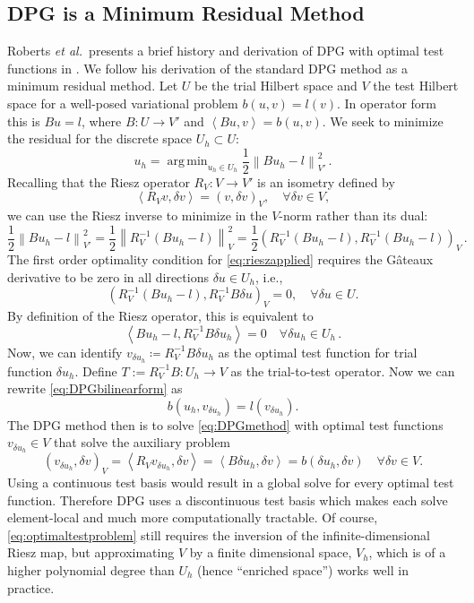 \documentclass[letterpaper]{article}
\DeclareMathOperator*{\argmin}{\arg\,\min}
\newcommand{\eqnref}[1]{\eqref{eq:#1}}
\newcommand{\norm}[1]{\left\| #1 \right\|}
\newcommand{\LRp}[1]{\left( #1 \right)}
\newcommand{\LRa}[1]{\left\langle #1 \right\rangle}
\def\etal{{\it et al.~}}
\begin{document}
\subsection{DPG is a Minimum Residual Method}
Roberts \etal presents a brief history and derivation of DPG with optimal test functions in
\cite{DPGStokes}. We follow his derivation of the standard DPG method as a
minimum residual method. Let $U$ be the trial Hilbert space and $V$ the test
Hilbert space for a well-posed variational problem $b(u,v)=l(v)$. In operator
form this is $Bu=l$, where $B:U\rightarrow V'$ and $\LRa{Bu,v}=b(u,v)$. We seek to minimize the
residual for the discrete space $U_h\subset U$:
\begin{equation}
u_h=\argmin_{u_h\in U_h}\frac{1}{2}\norm{Bu_h-l}^2_{V'}\,.
\label{minresidual}
\end{equation}
Recalling that the Riesz operator $R_V:V\rightarrow V'$ is an isometry defined
by
\[
\LRa{R_Vv,\delta v}=\LRp{v,\delta v}_V,\quad\forall\delta v\in V,
\]
we can use the Riesz inverse to minimize in the $V$-norm rather than its dual:
\begin{equation}
\frac{1}{2}\norm{Bu_h-l}^2_{V'}=\frac{1}{2}\norm{R_V^{-1}(Bu_h-l)}^2_V
=\frac{1}{2}\LRp{R_V^{-1}(Bu_h-l),R_V^{-1}(Bu_h-l)}_V\,.
\label{eq:rieszapplied}
\end{equation}
The first order optimality condition for \eqnref{rieszapplied} requires
the G\^ateaux derivative to be zero in all directions $\delta u \in
U_h$, i.e.,
\[
\left(R_V^{-1}(Bu_h-l),R_V^{-1}B\delta u\right)_V = 0, \quad \forall \delta u \in U.
\]
By definition of the Riesz operator, this is equivalent to
\begin{equation}
\LRa{Bu_h-l,R_V^{-1}B\delta u_h}=0\quad\forall\delta u_h\in U_h\,.
\label{eq:DPGbilinearform}
\end{equation}
Now, we can identify $v_{\delta u_h}\coloneqq R_V^{-1}B\delta u_h$ as the
optimal test function for trial function $\delta u_h$. Define $T:=R_V^{-1}B:U_h\rightarrow V$ as the trial-to-test operator. Now we can rewrite
\eqnref{DPGbilinearform} as
\begin{equation}
b(u_h,v_{\delta u_h})=l(v_{\delta u_h}).
\label{eq:DPGmethod}
\end{equation}
The DPG method then is to solve \eqnref{DPGmethod} with optimal test functions
$v_{\delta u_h}\in V$ that solve the auxiliary problem
\begin{equation}
\LRp{v_{\delta u_h},\delta v}_V=\LRa{R_Vv_{\delta u_h},\delta v}
=\LRa{B\delta u_h,\delta v}=b(\delta u_h,\delta v)\quad\forall\delta v\in V.
\label{eq:optimaltestproblem}
\end{equation}
Using a continuous test basis would result in a global solve for every optimal
test function. Therefore DPG uses a discontinuous test basis which makes each
solve element-local and much more computationally tractable. Of course,
\eqnref{optimaltestproblem} still requires the inversion of the
infinite-dimensional Riesz map, but approximating $V$ by a finite
dimensional space, $V_h$, which is of a higher polynomial degree than $U_h$ (hence
``enriched space'') works well in practice\cite{DPGOverview2}.
\end{document}
